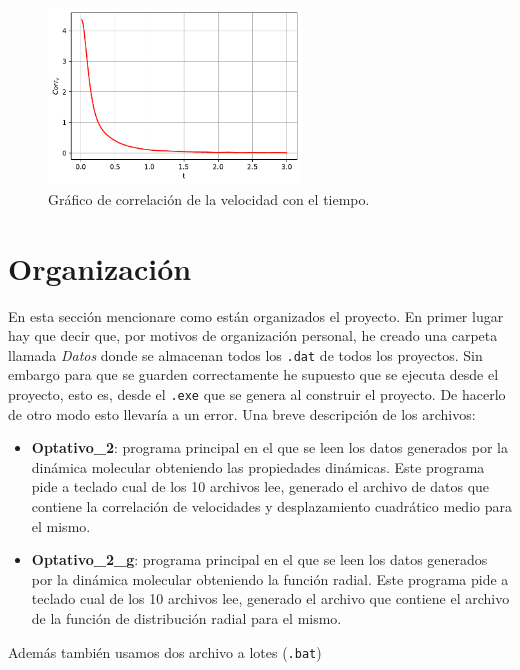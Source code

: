 \documentclass[11pt]{article} %
\begin{document}
\begin{figure}[h!] \centering
	\includegraphics[width=0.6\textwidth]{../../Graficas/Optativo2/Corr_vel.pdf}
	\caption{Gráfico de correlación de la velocidad con el tiempo.}
\end{figure}


\section{Organización} \label{Sec:05}

En esta sección mencionare como están organizados el proyecto. En primer lugar hay que decir que, por motivos de organización personal, he creado una carpeta llamada \textit{Datos} donde se almacenan todos los \texttt{.dat} de todos los proyectos. Sin embargo para que se guarden correctamente he supuesto que se ejecuta desde el proyecto, esto es, desde el \texttt{.exe} que se genera al construir el proyecto. De hacerlo de otro modo esto llevaría a un error. Una breve descripción de los archivos:

\begin{itemize}
	\item \textbf{Optativo\_2}: programa principal en el que se leen los datos generados por la dinámica molecular obteniendo las propiedades dinámicas. Este programa pide a teclado cual de los 10 archivos lee, generado el archivo de datos que contiene la correlación de velocidades y desplazamiento cuadrático medio para el mismo. 
	\item \textbf{Optativo\_2\_g}: programa principal en el que se leen los datos generados por la dinámica molecular obteniendo la función radial. Este programa pide a teclado cual de los 10 archivos lee, generado el archivo que contiene el archivo de la función de distribución radial para el mismo.
\end{itemize}
Además también usamos dos archivo a lotes (\texttt{.bat})
\end{document}
